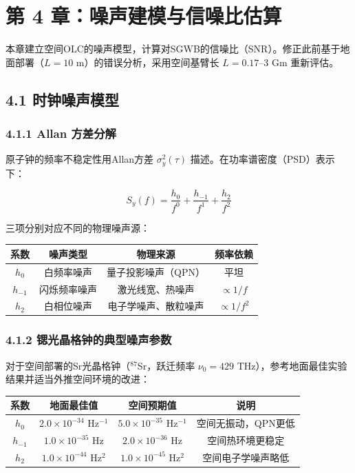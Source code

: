 \documentclass[12pt,a4paper]{article}
\begin{document}
\section{第 4 章：噪声建模与信噪比估算}


本章建立空间OLC的噪声模型，计算对SGWB的信噪比（SNR）。修正此前基于地面部署（$L = 10$ m）的错误分析，采用空间基臂长 $L = 0.17$–3 Gm 重新评估。

\subsection{4.1 时钟噪声模型}


\subsubsection{4.1.1 Allan 方差分解}


原子钟的频率不稳定性用Allan方差 $\sigma_y^2(\tau)$ 描述。在功率谱密度（PSD）表示下：

$$S_y(f) = \frac{h_0}{f^0} + \frac{h_{-1}}{f^1} + \frac{h_2}{f^2}$$

三项分别对应不同的物理噪声源：

\begin{tabular}{|c|c|c|c|}
\hline
系数 & 噪声类型 & 物理来源 & 频率依赖 \\
\hline
$h_0$ & 白频率噪声 & 量子投影噪声（QPN） & 平坦 \\
$h_{-1}$ & 闪烁频率噪声 & 激光线宽、热噪声 & $\propto 1/f$ \\
$h_2$ & 白相位噪声 & 电子学噪声、散粒噪声 & $\propto 1/f^2$ \\
\hline
\end{tabular}


\subsubsection{4.1.2 锶光晶格钟的典型噪声参数}


对于空间部署的Sr光晶格钟（$^{87}$Sr，跃迁频率 $\nu_0 = 429$ THz），参考地面最佳实验结果并适当外推空间环境的改进：

\begin{tabular}{|c|c|c|c|}
\hline
系数 & 地面最佳值 & 空间预期值 & 说明 \\
\hline
$h_0$ & $2.0 \times 10^{-34}$ Hz$^{-1}$ & $5.0 \times 10^{-35}$ Hz$^{-1}$ & 空间无振动，QPN更低 \\
$h_{-1}$ & $1.0 \times 10^{-35}$ Hz & $2.0 \times 10^{-36}$ Hz & 空间热环境更稳定 \\
$h_2$ & $1.0 \times 10^{-44}$ Hz$^2$ & $1.0 \times 10^{-45}$ Hz$^2$ & 空间电子学噪声略低 \\
\hline
\end{tabular}
\end{document}
